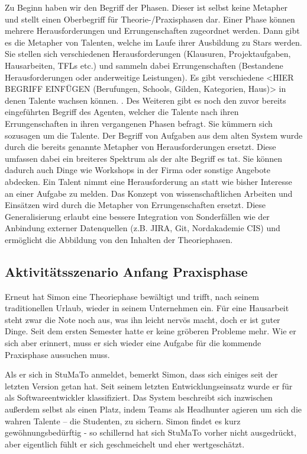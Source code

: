\documentclass[
  12pt,
  ngerman,
  a4paper,
]{article}
\begin{document}
Zu Beginn haben wir den Begriff der Phasen. Dieser ist selbst keine
Metapher und stellt einen Oberbegriff für Theorie-/Praxisphasen dar.
Einer Phase können mehrere Herausforderungen und Errungenschaften
zugeordnet werden. Dann gibt es die Metapher von Talenten, welche im
Laufe ihrer Ausbildung zu Stars werden. Sie stellen sich verschiedenen
Herausforderungen (Klausuren, Projektaufgaben, Hausarbeiten, TFLs etc.)
und sammeln dabei Errungenschaften (Bestandene Herausforderungen oder
anderweitige Leistungen). Es gibt verschiedene \textless{}HIER BEGRIFF
EINFÜGEN (Berufungen, Schools, Gilden, Kategorien, Haus)\textgreater{}
in denen Talente wachsen können. . Des Weiteren gibt es noch den zuvor
bereits eingeführten Begriff des Agenten, welcher die Talente nach ihren
Errungenschaften in ihren vergangenen Phasen befragt. Sie kümmern sich
sozusagen um die Talente. Der Begriff von Aufgaben aus dem alten System
wurde durch die bereits genannte Metapher von Herausforderungen ersetzt.
Diese umfassen dabei ein breiteres Spektrum als der alte Begriff es tat.
Sie können dadurch auch Dinge wie Workshops in der Firma oder sonstige
Angebote abdecken. Ein Talent nimmt eine Herausforderung an statt wie
bisher Interesse an einer Aufgabe zu melden. Das Konzept von
wissenschaftlichen Arbeiten und Einsätzen wird durch die Metapher von
Errungenschaften ersetzt. Diese Generalisierung erlaubt eine bessere
Integration von Sonderfällen wie der Anbindung externer Datenquellen
(z.B. JIRA, Git, Nordakademie CIS) und ermöglicht die Abbildung von den
Inhalten der Theoriephasen.

\hypertarget{aktivituxe4tsszenario-anfang-praxisphase}{%
\subsection{Aktivitätsszenario Anfang
Praxisphase}\label{aktivituxe4tsszenario-anfang-praxisphase}}

Erneut hat Simon eine Theoriephase bewältigt und trifft, nach seinem
traditionellen Urlaub, wieder in seinem Unternehmen ein. Für eine
Hausarbeit steht zwar die Note noch aus, was ihn leicht nervös macht,
doch er ist guter Dinge. Seit dem ersten Semester hatte er keine
gröberen Probleme mehr. Wie er sich aber erinnert, muss er sich wieder
eine Aufgabe für die kommende Praxisphase aussuchen muss.

Als er sich in StuMaTo anmeldet, bemerkt Simon, dass sich einiges seit
der letzten Version getan hat. Seit seinem letzten Entwicklungseinsatz
wurde er für als Softwareentwickler klassifiziert. Das System beschreibt
sich inzwischen außerdem selbst als einen Platz, indem Teams als
Headhunter agieren um sich die wahren Talente -- die Studenten, zu
sichern. Simon findet es kurz gewöhnungsbedürftig - so schillernd hat
sich StuMaTo vorher nicht ausgedrückt, aber eigentlich fühlt er sich
geschmeichelt und eher wertgeschätzt.
\end{document}
